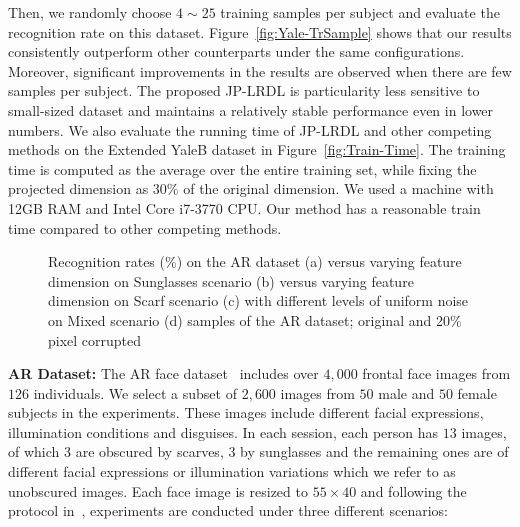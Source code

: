 \documentclass[journal]{IEEEtran}
\begin{document}
Then, we randomly choose $4 \sim 25$ training samples per subject and evaluate the recognition rate on this dataset. Figure~\ref{fig:Yale-TrSample} shows that our results consistently outperform other counterparts under the same configurations. Moreover, significant improvements in the results are observed when there are few samples per subject. The proposed JP-LRDL is particularity less sensitive to small-sized dataset and maintains a relatively stable performance even in lower numbers. We also evaluate the running time of JP-LRDL and other competing methods on the Extended YaleB dataset in Figure~\ref{fig:Train-Time}. The training time is computed as the average over the entire training set, while fixing the projected dimension as $30\%$ of the original dimension. We used a machine with 12GB RAM and Intel Core i7-3770 CPU. Our method has a reasonable train time compared to other competing methods.
\begin{figure}[b]
\centering
{}  
\hspace{2pt}
\vspace{0.1em}
\hspace{6pt}
\caption{Recognition rates (\%) on the AR dataset (a) versus varying feature dimension on Sunglasses scenario (b) versus varying feature dimension on Scarf scenario (c) with different levels of uniform noise on Mixed scenario (d) samples of the AR dataset; original and 20\% pixel corrupted}
\vspace{-1.5em}
\end{figure} 

\vspace{1em}
\textbf{AR Dataset:} The AR face dataset~\cite{AR} includes over $4,000$ frontal face images from $126$ individuals. We select a subset of $2,600$ images from $50$ male and $50$ female subjects in the experiments. These images include different facial expressions, illumination conditions and disguises. In each session, each person has $13$ images, of which $3$ are obscured by scarves, $3$ by sunglasses and the remaining ones are of different facial expressions or illumination variations which we refer to as unobscured images. Each face image is resized to $55 \times 40$ and following the protocol in~\cite{Structured-LR-DL}, experiments are conducted under three different scenarios:
\end{document}
